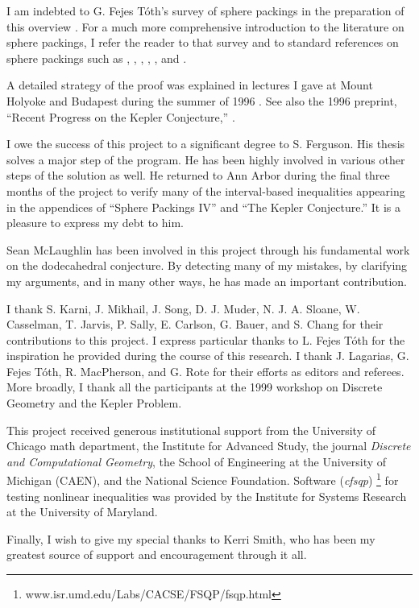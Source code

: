 I am indebted to G. Fejes T\'oth's survey of sphere packings
in the preparation of this overview \cite{Fej97}.
For a much more comprehensive
introduction to the literature on sphere packings, I refer
the reader to that survey and to standard references on
sphere packings such as \cite{CoSl93}, \cite{PaA95}, \cite{Goo97},
\cite{Rog64}, \cite{Fej64}, and \cite{Fej72}.

A detailed strategy of the proof was explained in lectures I gave
at Mount Holyoke and Budapest during the summer of 1996
\cite{Hal96}. See also the 1996 preprint, ``Recent Progress on the
Kepler Conjecture,''  \cite{Hal96}.

I owe the success of this project to a significant degree to
S. Ferguson.  His thesis solves a major step of the program.
He has been highly involved in various other steps of the solution as well.
He returned to Ann Arbor during the final three months of the project
to verify many of the interval-based inequalities appearing in
the appendices of ``Sphere Packings IV'' and ``The Kepler Conjecture.''
It is a pleasure to express my debt to him.

Sean McLaughlin has been involved in this project
through his fundamental work on the dodecahedral conjecture.
By detecting many of my mistakes, by clarifying my arguments,
 and in many other ways, he has made an important contribution.

 I thank S. Karni, J. Mikhail, J. Song, D. J. Muder, N. J. A. Sloane,
W. Casselman, T. Jarvis, P. Sally, E. Carlson, G. Bauer, and S.
Chang for their contributions to this project.  I express particular
thanks to L. Fejes T\'oth for the inspiration he provided during the
course of this research.  I thank J. Lagarias, G. Fejes T\'oth, R.
MacPherson, and G. Rote for their efforts as editors and referees.
More broadly, I thank all the participants at the 1999 workshop on
Discrete Geometry and the Kepler Problem.

This project received generous institutional support from the
University of Chicago math department, the Institute for Advanced
Study, the journal {\it Discrete and Computational Geometry}, the
School of Engineering at the University of Michigan (CAEN), and
the National Science Foundation.
  Software
({\it cfsqp}) \footnote{\quad
www.isr.umd.edu/Labs/CACSE/FSQP/fsqp.html} for testing nonlinear
inequalities was provided by the Institute for Systems Research at
the University of Maryland.

Finally, I wish to give my special thanks to Kerri Smith, who has been
my greatest source of support and encouragement through it all.




\begin{thebibliography}{XXXX94}



\end{thebibliography}
